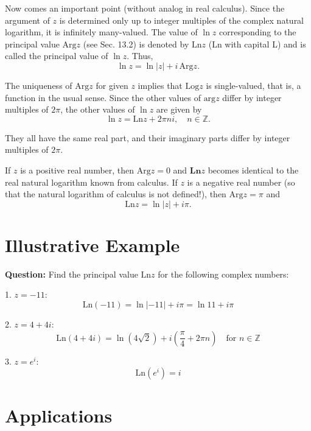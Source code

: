 \documentclass[12pt]{article}
\begin{document}
Now comes an important point (without analog in real calculus). Since the argument of \(z\) is determined only up to integer multiples of the complex natural logarithm, it is infinitely many-valued. The value of \(\ln z\) corresponding to the principal value \(\text{Arg} z\) (see Sec. 13.2) is denoted by \(\text{Ln} z\) (\(\text{Ln}\) with capital L) and is called the principal value of \(\ln z\). Thus,
\begin{equation}
    \ln z = \ln |z| + i\,\text{Arg} z. \tag{2}
\end{equation}


The uniqueness of \(\text{Arg} z\) for given \(z\) implies that \(\text{Log} z\) is single-valued, that is, a function in the usual sense. Since the other values of \(\text{arg} z\) differ by integer multiples of \(2\pi\), the other values of \(\ln z\) are given by
\begin{equation}
    \ln z = \text{Ln} z + 2\pi ni, \quad n \in \mathbb{Z}. \tag{3}
\end{equation}

They all have the same real part, and their imaginary parts differ by integer multiples of \(2\pi\).

If \(z\) is a positive real number, then \(\text{Arg} z = 0\) and $ \textbf{Ln} z $ becomes identical to the real natural logarithm known from calculus. If \(z\) is a negative real number (so that the natural logarithm of calculus is not defined!), then \(\text{Arg} z = \pi\) and
\begin{equation}
    \text{Ln} z = \ln |z| + i\pi. \tag{4a}
\end{equation}
\section{Illustrative Example}

\textbf{Question:} Find the principal value \( \text{Ln} z \) for the following complex numbers:

1. \( z = -11 \):
\[
\text{Ln}(-11) = \ln|{-11}| + i\pi = \ln 11 + i\pi
\]

2. \( z = 4 + 4i \):
\[
\text{Ln}(4 + 4i) = \ln(4\sqrt{2}) + i\left(\frac{\pi}{4} + 2\pi n\right) \quad \text{for } n \in \mathbb{Z}
\]

3. \( z = e^i \):
\[
\text{Ln}(e^i) = i
\]





\section{Applications}
\end{document}
